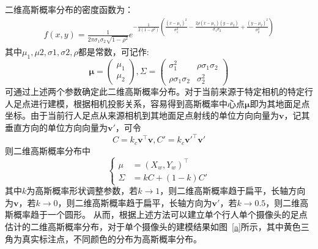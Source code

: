 二维高斯概率分布的密度函数为：
\begin{equation*}
  \begin{aligned}
    f(x,y)=\frac{1}{2\pi\sigma_{1}\sigma_{2}\sqrt{1-\rho^{2}}}
    e^{
      -\frac{1}{2(1-\rho^{2})}\left(
        \frac{(x-\mu_{1})^{2}}{\sigma_{1}^{2}} - \frac{2\rho(x-\mu_{1})(y-\mu_{2})}{\sigma_{1}\sigma_{2}} 
        + \frac{(y-\mu_{2})^{2}}{\sigma_{2}^{2}}
        \right)
      }
  \end{aligned}
\end{equation*}
其中$\mu_{1},\mu{2},\sigma{1},\sigma{2},\rho$都是常数，可记作:
\begin{equation*}
  \bm{\mu}=\left(
    \begin{matrix}
      \mu_{1} \\ \mu_{2}
    \end{matrix}
  \right),
  \Sigma=\left(
    \begin{matrix}
      \sigma_{1}^{2} & \rho\sigma_{1}\sigma_{2} \\
      \rho\sigma_{1}\sigma_{2} & \sigma_{2}^{2}
    \end{matrix}
  \right)
\end{equation*}
可通过上述两个参数确定此二维高斯概率分布。对于当前来源于特定相机的特定行人足点进行建模，根据相机投影关系，容易得到高斯概率中心点$\bm{\mu}$即为其地面足点坐标。由于当前行人足点从来源相机到其地面足点射线的单位方向向量为$\bm{v}$，记其垂直方向的单位方向向量为$\bm{v}'$，可令
\begin{equation*}
C=k_{c}\bm{v}^\top\bm{v}, C'=k_{c}\bm{v}'^\top\bm{v}'
\end{equation*}
则二维高斯概率分布中
\begin{equation*}
  \left\{
    \begin{aligned}
      \mu & = (X_{w}, Y_{w})^\top \\
      \Sigma & = kC + (1-k)C'
    \end{aligned}
  \right.
\end{equation*}
其中$k$为高斯概率形状调整参数，若$k\rightarrow1$，则二维高斯概率趋于扁平，长轴方向为$\bm{v}$，若$k\rightarrow0$，则二维高斯概率趋于扁平，长轴方向为$\bm{v}'$，若$k\rightarrow0.5$，则二维高斯概率趋于一个圆形。
从而，根据上述方法可以建立单个行人单个摄像头的足点估计的二维高斯概率分布，对于单个摄像头的建模结果如图~\ref{a}所示，其中黄色三角为真实标注点，不同颜色的分布为高斯概率分布。
